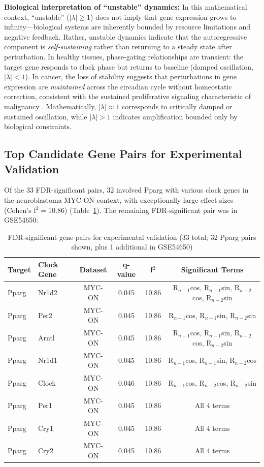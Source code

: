 \documentclass[11pt,a4paper]{article}
\begin{document}
\textbf{Biological interpretation of ``unstable'' dynamics:} In this mathematical context, ``unstable'' ($|\lambda| \geq 1$) does not imply that gene expression grows to infinity---biological systems are inherently bounded by resource limitations and negative feedback. Rather, unstable dynamics indicate that the autoregressive component is \textit{self-sustaining} rather than returning to a steady state after perturbation. In healthy tissues, phase-gating relationships are transient: the target gene responds to clock phase but returns to baseline (damped oscillation, $|\lambda| < 1$). In cancer, the loss of stability suggests that perturbations in gene expression are \textit{maintained} across the circadian cycle without homeostatic correction, consistent with the sustained proliferative signaling characteristic of malignancy \citep{hanahan2011hallmarks}. Mathematically, $|\lambda| \approx 1$ corresponds to critically damped or sustained oscillation, while $|\lambda| > 1$ indicates amplification bounded only by biological constraints.

\subsection{Top Candidate Gene Pairs for Experimental Validation}

Of the 33 FDR-significant pairs, 32 involved Pparg with various clock genes in the neuroblastoma MYC-ON context, with exceptionally large effect sizes (Cohen's f$^2 = 10.86$) (Table~\ref{tab:candidates}). The remaining FDR-significant pair was in GSE54650:

\begin{table}[H]
\centering
\caption{FDR-significant gene pairs for experimental validation (33 total; 32 Pparg pairs shown, plus 1 additional in GSE54650)}
\label{tab:candidates}
\begin{tabular}{llcccc}
\toprule
Target & Clock Gene & Dataset & q-value & f$^2$ & Significant Terms \\
\midrule
Pparg & Nr1d2 & MYC-ON & 0.045 & 10.86 & R$_{n-1}$cos, R$_{n-1}$sin, R$_{n-2}$cos, R$_{n-2}$sin \\
Pparg & Per2 & MYC-ON & 0.045 & 10.86 & R$_{n-1}$cos, R$_{n-1}$sin, R$_{n-2}$sin \\
Pparg & Arntl & MYC-ON & 0.045 & 10.86 & R$_{n-1}$cos, R$_{n-1}$sin, R$_{n-2}$cos, R$_{n-2}$sin \\
Pparg & Nr1d1 & MYC-ON & 0.045 & 10.86 & R$_{n-1}$cos, R$_{n-1}$sin, R$_{n-2}$cos \\
Pparg & Clock & MYC-ON & 0.046 & 10.86 & R$_{n-1}$cos, R$_{n-2}$cos, R$_{n-2}$sin \\
Pparg & Per1 & MYC-ON & 0.045 & 10.86 & All 4 terms \\
Pparg & Cry1 & MYC-ON & 0.045 & 10.86 & All 4 terms \\
Pparg & Cry2 & MYC-ON & 0.045 & 10.86 & All 4 terms \\
\bottomrule
\end{tabular}
\end{table}
\end{document}
